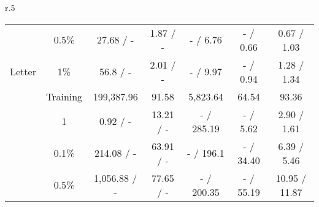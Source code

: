 \begin{wraptable}[23]{r}{.5\textwidth}
{\begin{tabular}{ccccccc}
                                                     & 0.5\%                           & 27.68 / -                                                           & 1.87 / -                                                         & - / 6.76                                                              & - / 0.66                                                              & 0.67 / 1.03                        \\
\multirow{-5}{*}{Letter}                             & 1\%                             & 56.8 / -                                                            & 2.01 / -                                                         & - / 9.97                                                              & - / 0.94                                                              & 1.28 / 1.34                        \\\midrule
                                                     & Training                        & 199,387.96                                                          & 91.58                                                            & 5,823.64                                                              & 64.54                                                                 & 93.36                              \\
                                                     & 1                               & 0.92 / -                                                            & 13.21 / -                                                        & - / 285.19                                                            & - / 5.62                                                              & 2.90 / 1.61                        \\
                                                     & 0.1\%                           & 214.08 / -                                                          & 63.91 / -                                                        & - / 196.1                                                             & - / 34.40                                                             & 6.39 / 5.46                        \\
                                                     & 0.5\%                           & 1,056.88 / -                                                        & 77.65 / -                                                        & - / 200.35                                                            & - / 55.19                                                             & 10.95 / 11.87                      \\

\end{tabular}}
\end{wraptable}
